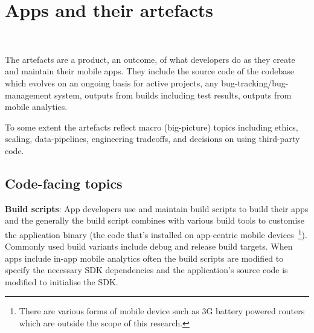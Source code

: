 \chapter{Apps and their artefacts}~\label{chapter-apps-and-their-artefacts}

The artefacts are a product, an outcome, of what developers do as they create and maintain their mobile apps. They include the source code of the codebase which evolves on an ongoing basis for active projects, any bug-tracking/bug-management system, outputs from builds including test results, outputs from mobile analytics. 

To some extent the artefacts reflect macro (big-picture) topics including ethics, scaling, data-pipelines, engineering tradeoffs, and decisions on using third-party code.


\section{Code-facing topics}
\textbf{Build scripts}: App developers use and maintain build scripts to build their apps and the generally the build script combines with various build tools to customise the application binary (the code that's installed on app-centric mobile devices~\footnote{There are various forms of mobile device such as 3G battery powered routers which are outside the scope of this research.}). Commonly used build variants include debug and release build targets. When apps include in-app mobile analytics often the build scripts are modified to specify the necessary SDK dependencies and the application's source code is modified to initialise the SDK.

